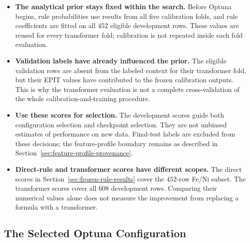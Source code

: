 \documentclass[11pt]{article}
\newenvironment{notes}
  {\begin{itemize}\setlength{\itemsep}{0.45em}\setlength{\parsep}{0pt}}
  {\end{itemize}}
\begin{document}
\begin{notes}
    \item \textbf{The analytical prior stays fixed within the search.}
    Before Optuna begins, rule probabilities use results from
    all five calibration folds, and rule coefficients are
    fitted on all \(452\) eligible development rows.
    These values are reused for every transformer fold;
    calibration is not repeated inside each fold evaluation.

    \item \textbf{Validation labels have already influenced the prior.}
    The eligible validation rows are absent from the labeled
    context for their transformer fold, but their EPIT values
    have contributed to the frozen calibration outputs.
    This is why the transformer evaluation is not a complete
    cross-validation of the whole calibration-and-training
    procedure.

    \item \textbf{Use these scores for selection.}
    The development scores guide both configuration selection
    and checkpoint selection. They are not unbiased estimates
    of performance on new data.
    Final-test labels are excluded from these decisions;
    the feature-profile boundary remains as described in
    Section~\ref{sec:feature-profile-provenance}.

    \item \textbf{Direct-rule and transformer scores have different scopes.}
    The direct scores in
    Section~\ref{sec:frozen-rule-results} cover the
    \(452\)-row Fe/Ni subset. The transformer scores cover
    all \(608\) development rows.
    Comparing their numerical values alone does not measure
    the improvement from replacing a formula with a transformer.
\end{notes}

\subsection{The Selected Optuna Configuration}
\label{sec:selected-prior-configuration}
\end{document}
